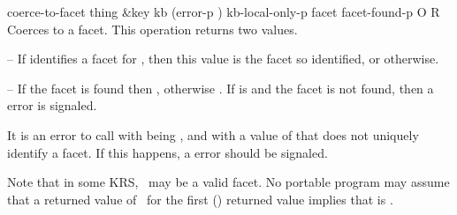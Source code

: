 \begin{okbcop}{coerce-to-facet}{ thing \&key kb (error-p \true) kb-local-only-p} { facet facet-found-p } { O } { R } {  }
Coerces  to a facet.  This operation returns two values.
   \bitem
   \item {} -- If  identifies a facet for ,
                           then this value is the facet so identified, or
                           \false otherwise.
   \item {} -- If the facet is found then \true,
                                   otherwise \false.
   \eitem
   If  is \true and the facet is not found, then a
    error is signaled.

   It is an error to call  with  being
   \true, and with a value of  that does not uniquely identify
   a facet.  If this happens, a  error should be
   signaled.

   Note that in some KRS, \false\ may be a valid facet.  No portable
   program may assume that a returned value of \false\ for the first
   () returned value implies that  is
   \false.
\end{okbcop}

